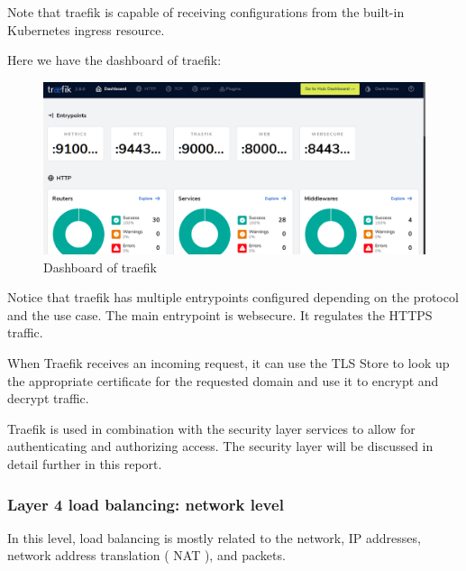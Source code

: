 Note that traefik is capable of receiving configurations from the built-in Kubernetes ingress resource. 

Here we have the dashboard of traefik: 

\begin{figure}[H]\centering
\includegraphics[width=1.0\textwidth,angle=00]{assets/f25.png}
\caption{ Dashboard of traefik }
\label{fig:dashboard of traefik}
\end{figure}

Notice that traefik has multiple entrypoints configured depending on the protocol and the use case. The main entrypoint is websecure. It regulates the HTTPS traffic.  

When Traefik receives an incoming request, it can use the TLS Store to look up the appropriate certificate for the requested domain and use it to encrypt and decrypt traffic. 

Traefik is used in combination with the security layer services to allow for authenticating and authorizing access. The security layer will be discussed in detail further in this report. 

\subsubsection{Layer 4 load balancing: network level }

In this level, load balancing is mostly related to the network, IP addresses, network address translation ( NAT ), and packets. 

